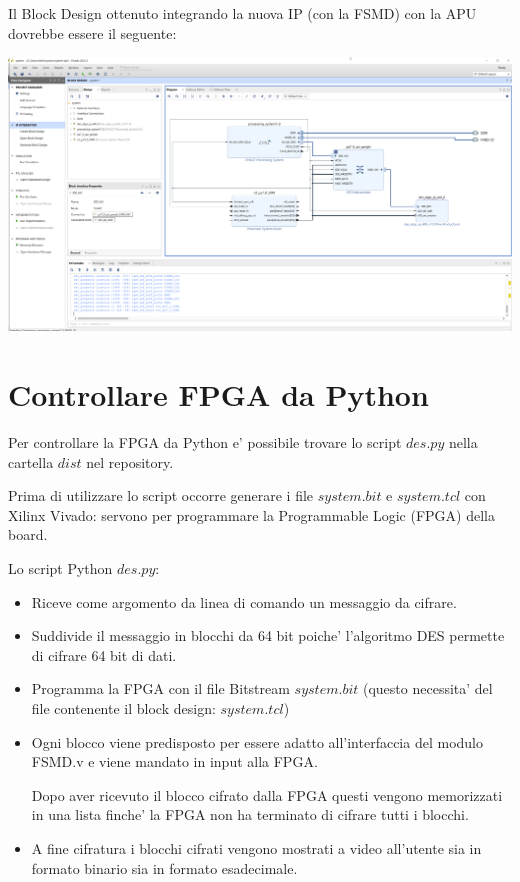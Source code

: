 \documentclass[a4paper]{article}
\begin{document}
Il Block Design ottenuto integrando la nuova IP (con la FSMD) con la APU dovrebbe essere il seguente:

\includegraphics[width=6in]{assets/block_diagram.png}

\section{Controllare FPGA da Python}

Per controllare la FPGA da Python e' possibile trovare lo script $des.py$ nella cartella $dist$ nel repository.


Prima di utilizzare lo script occorre generare i file $system.bit$ e $system.tcl$ con Xilinx Vivado: servono per programmare la Programmable Logic (FPGA) della board.

Lo script Python $des.py$:
\begin{itemize}
    \item Riceve come argomento da linea di comando un messaggio da cifrare.
    \item Suddivide il messaggio in blocchi da 64 bit poiche' l'algoritmo DES permette di cifrare 64 bit di dati.

    \item Programma la FPGA con il file Bitstream $system.bit$ (questo necessita' del file contenente il block design: $system.tcl$)
    \item Ogni blocco viene predisposto per essere adatto all'interfaccia del modulo FSMD.v e viene mandato in input alla FPGA.

          Dopo aver ricevuto il blocco cifrato dalla FPGA questi vengono memorizzati in una lista finche' la FPGA non ha terminato di cifrare tutti i blocchi.
    \item A fine cifratura i blocchi cifrati vengono mostrati a video all'utente sia in formato binario sia in formato esadecimale.
\end{itemize}
\end{document}
